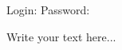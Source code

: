 \documentclass[notitlepage,a4paper]{article}
\begin{document}
\thispagestyle{empty}


{\fontsize{8}{0}\selectfont Login:}
{\fontsize{11}{0}\selectfont \textbf{\texttt{}}}
\hfill
{\fontsize{8}{0}\selectfont Password:}
{\fontsize{11}{0}\selectfont \textbf{\texttt{}}}

\vspace{3mm}

{\fontsize{8}{0}\selectfont
Write your text here...
}
\end{document}
